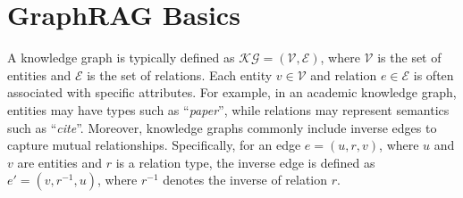 \section{GraphRAG Basics}\label{sec:background}




A knowledge graph is typically defined as $\mathcal{KG} = (\mathcal{V}, \mathcal{E})$, where $\mathcal{V}$ is the set of entities and $\mathcal{E}$ is the set of relations. Each entity $v \in \mathcal{V}$ and relation $e \in \mathcal{E}$ is often associated with specific attributes. For example, in an academic knowledge graph, entities may have types such as ``\textit{paper}'', while relations may represent semantics such as ``\textit{cite}''. Moreover, knowledge graphs commonly include inverse edges to capture mutual relationships. Specifically, for an edge $e = (u, r, v)$, where $u$ and $v$ are entities and $r$ is a relation type, the inverse edge is defined as $e' = (v, r^{-1}, u)$, where $r^{-1}$ denotes the inverse of relation $r$.


